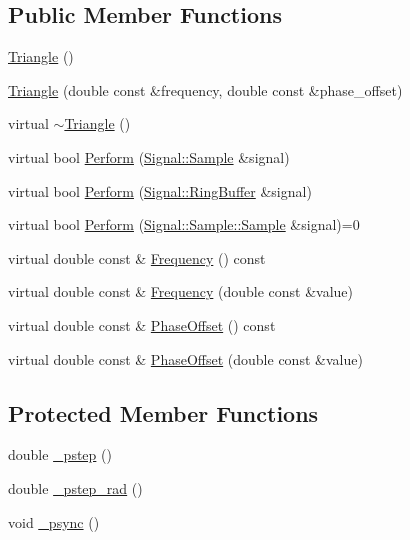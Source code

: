 \subsection*{Public Member Functions}
\begin{DoxyCompactItemize}
\item 
\hyperlink{classDSG_1_1Analog_1_1Triangle_a08619419378eaa2f5584e0dbe274cec0}{Triangle} ()
\item 
\hyperlink{classDSG_1_1Analog_1_1Triangle_a2c20559e66ca309d57fdc30b37c6d027}{Triangle} (double const \&frequency, double const \&phase\-\_\-offset)
\item 
virtual \hyperlink{classDSG_1_1Analog_1_1Triangle_a10675a2b5f9d403b80dea7953fda34a3}{$\sim$\-Triangle} ()
\item 
virtual bool \hyperlink{classDSG_1_1Analog_1_1Triangle_ad0c5bbf1c908a67edfdc61dd34e4103c}{Perform} (\hyperlink{classDSG_1_1Signal_1_1Sample}{Signal\-::\-Sample} \&signal)
\item 
virtual bool \hyperlink{classDSG_1_1Analog_1_1Triangle_aac8b754fbe86ff4820a004becb6c719b}{Perform} (\hyperlink{classDSG_1_1Signal_1_1RingBuffer}{Signal\-::\-Ring\-Buffer} \&signal)
\item 
virtual bool \hyperlink{classDSG_1_1SignalProcess_ae8a803d175eca1ec5f34a52035a082b4}{Perform} (\hyperlink{classDSG_1_1Signal_1_1Sample_a21db6fade3ee3554ed3887cb2b74daff}{Signal\-::\-Sample\-::\-Sample} \&signal)=0
\item 
virtual double const \& \hyperlink{classDSG_1_1SignalGenerator_aedac746c5a70818d120858542ecb7c45}{Frequency} () const 
\item 
virtual double const \& \hyperlink{classDSG_1_1SignalGenerator_ae3ce8d45bafabbd86a0f535b15c3cd46}{Frequency} (double const \&value)
\item 
virtual double const \& \hyperlink{classDSG_1_1SignalGenerator_a1ce521847edd0b837fd840998f906b4b}{Phase\-Offset} () const 
\item 
virtual double const \& \hyperlink{classDSG_1_1SignalGenerator_a08b71b1f30ba65e629642c570291dc0e}{Phase\-Offset} (double const \&value)
\end{DoxyCompactItemize}
\subsection*{Protected Member Functions}
\begin{DoxyCompactItemize}
\item 
double \hyperlink{classDSG_1_1SignalGenerator_ac0d781b8673b3a283bf7c133290ede50}{\-\_\-pstep} ()
\item 
double \hyperlink{classDSG_1_1SignalGenerator_ae660eb4caa88b8d278f8d24d0908a487}{\-\_\-pstep\-\_\-rad} ()
\item 
void \hyperlink{classDSG_1_1SignalGenerator_a05baccb38d1e52860d4fcf7cb8430efc}{\-\_\-psync} ()
\end{DoxyCompactItemize}
